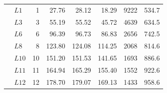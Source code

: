 \begin{table}[t]
\begin{tabular}{llrrrrrr}
         & \(L1\) & 1 & 27.76 & 28.12 & 18.29 & 9222 & 534.7 \\
         & \(L3\) & 3 & 55.19 & 55.52 & 45.72 & 4639 & 634.5 \\
         & \(L6\) & 6 & 96.39 & 96.73 & 86.83 & 2656 & 742.5 \\
         & \(L8\) & 8 & 123.80 & 124.08 & 114.25 & 2068 & 814.6 \\
         & \(L10\) & 10 & 151.20 & 151.53 & 141.65 & 1693 & 886.6 \\
         & \(L11\) & 11 & 164.94 & 165.29 & 155.40 & 1552 & 922.6 \\
         & \(L12\) & 12 & 178.70 & 179.07 & 169.13 & 1433 & 958.6 \\
        \bottomrule
    \end{tabular}
\end{table}